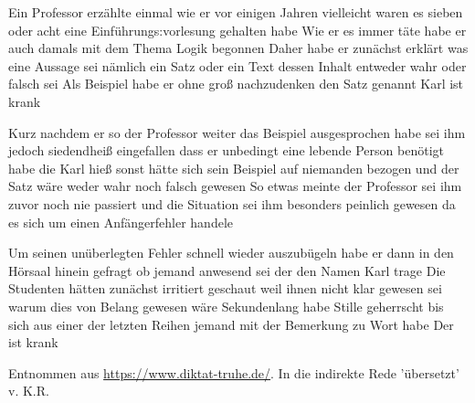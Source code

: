 \documentclass[
  DIV=calc,
  BCOR=5mm,
  11pt,
  headings=small,
  oneside,
  abstract=true,
  toc=bib,
  english,ngerman]{scrbook}
\begin{document}
\nocite{*}


{\Large \wesu 

Ein Professor erzählte einmal wie er vor einigen Jahren vielleicht waren es sieben oder acht 
eine Einführungs:vorlesung gehalten habe Wie er es immer täte habe er auch damals mit dem 
Thema Logik begonnen Daher habe er zunächst erklärt was eine Aussage sei nämlich ein Satz 
oder ein Text dessen Inhalt entweder wahr oder falsch sei Als Beispiel habe er 
ohne gro{\ss} nachzudenken den Satz genannt Karl ist krank 

Kurz nachdem er so der Professor weiter das Beispiel ausgesprochen habe sei ihm jedoch 
siedendhei{\ss} eingefallen dass er unbedingt eine lebende Person benötigt habe die Karl hie{\ss} 
sonst hätte sich sein Beispiel auf niemanden bezogen und der Satz wäre weder wahr noch falsch 
gewesen So etwas meinte der Professor sei ihm zuvor noch nie passiert und die Situation sei 
ihm besonders peinlich gewesen da es sich um einen Anfängerfehler handele 

Um seinen unüberlegten Fehler schnell wieder auszubügeln habe er dann in den Hörsaal hinein 
gefragt ob jemand anwesend sei der den Namen Karl trage Die Studenten hätten zunächst irritiert 
geschaut weil ihnen nicht klar gewesen sei warum dies von Belang gewesen wäre Sekundenlang 
habe Stille geherrscht bis sich aus einer der letzten Reihen jemand mit der 
Bemerkung zu Wort habe Der ist krank

}

\vspace{0.5cm}

\footnotesize{
Entnommen aus \href{https://www.diktat-truhe.de/}{https://www.diktat-truhe.de/}. In die indirekte Rede 'übersetzt' v. K.R.
}
\end{document}
